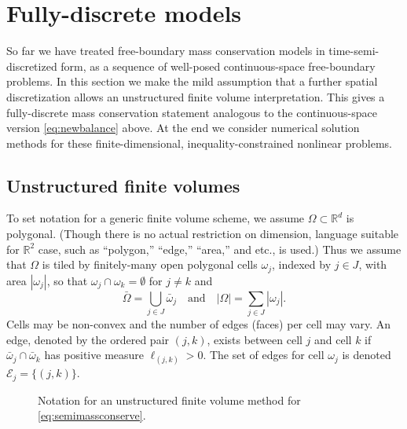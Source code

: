 \documentclass[final,onefignum]{siamart190516}
\newcommand\RR{\mathbb{R}}
\begin{document}
\section{Fully-discrete models}  \label{sec:spacediscretized}

So far we have treated free-boundary mass conservation models in time-semi-discretized form, as a sequence of well-posed continuous-space free-boundary problems.  In this section we make the mild assumption that a further spatial discretization allows an unstructured finite volume \cite{LeVeque2002} interpretation.  This gives a fully-discrete mass conservation statement analogous to the continuous-space version \eqref{eq:newbalance} above.  At the end we consider numerical solution methods for these finite-dimensional, inequality-constrained nonlinear problems.

\subsection{Unstructured finite volumes} \label{subsec:spacenotation}  To set notation for a generic finite volume scheme, we assume $\Omega \subset \RR^d$ is polygonal.  (Though there is no actual restriction on dimension, language suitable for $\RR^2$ case, such as ``polygon,'' ``edge,'' ``area,'' and etc., is used.)  Thus we assume that $\Omega$ is tiled by finitely-many open polygonal cells $\omega_j$, indexed by $j\in J$, with area $|\omega_j|$, so that $\omega_j \cap \omega_k = \emptyset$ for $j\ne k$ and
\begin{equation}
\bar\Omega = \bigcup_{j\in J} \bar \omega_j \quad \text{and} \quad |\Omega| = \sum_{j\in J} |\omega_j|.  \label{eq:tiling}
\end{equation}
Cells may be non-convex and the number of edges (faces) per cell may vary.  An edge, denoted by the ordered pair $(j,k)$, exists between cell $j$ and cell $k$ if $\bar\omega_j \cap \bar \omega_k$ has positive measure $\ell_{(j,k)}>0$.  The set of edges for cell $\omega_j$ is denoted $\mathcal{E}_j=\{(j,k)\}$.

\begin{figure}[ht]
\begin{center}

\end{center}
\caption{Notation for an unstructured finite volume method for \eqref{eq:semimassconserve}.}
\label{fig:fvmesh-notation}
\end{figure}
\end{document}
